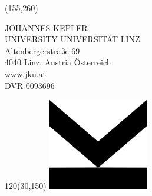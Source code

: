 \begin{textblock}{85} (155,260)
    \begin{minipage}[t]{40mm}
        {
            \selectfont
            JOHANNES KEPLER\\
            \ifeng{} UNIVERSITY
            \else UNIVERSITÄT
            \fi
            LINZ\\
        }
        Altenbergerstraße 69\\
        4040 Linz,
        \ifeng{} Austria
        \else Österreich
        \fi \\
        www.jku.at\\
        DVR 0093696
    \end{minipage}
\end{textblock}


\begin{textblock}{120}(30,150)
    \includegraphics[width=44mm]{cover/arr}
\end{textblock}

